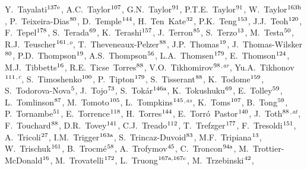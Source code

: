 \begin{flushleft}
Y.~Tayalati$^\textrm{\scriptsize 137e}$,
A.C.~Taylor$^\textrm{\scriptsize 107}$,
G.N.~Taylor$^\textrm{\scriptsize 91}$,
P.T.E.~Taylor$^\textrm{\scriptsize 91}$,
W.~Taylor$^\textrm{\scriptsize 163b}$,
P.~Teixeira-Dias$^\textrm{\scriptsize 80}$,
D.~Temple$^\textrm{\scriptsize 144}$,
H.~Ten~Kate$^\textrm{\scriptsize 32}$,
P.K.~Teng$^\textrm{\scriptsize 153}$,
J.J.~Teoh$^\textrm{\scriptsize 120}$,
F.~Tepel$^\textrm{\scriptsize 178}$,
S.~Terada$^\textrm{\scriptsize 69}$,
K.~Terashi$^\textrm{\scriptsize 157}$,
J.~Terron$^\textrm{\scriptsize 85}$,
S.~Terzo$^\textrm{\scriptsize 13}$,
M.~Testa$^\textrm{\scriptsize 50}$,
R.J.~Teuscher$^\textrm{\scriptsize 161}$$^{,o}$,
T.~Theveneaux-Pelzer$^\textrm{\scriptsize 88}$,
J.P.~Thomas$^\textrm{\scriptsize 19}$,
J.~Thomas-Wilsker$^\textrm{\scriptsize 80}$,
P.D.~Thompson$^\textrm{\scriptsize 19}$,
A.S.~Thompson$^\textrm{\scriptsize 56}$,
L.A.~Thomsen$^\textrm{\scriptsize 179}$,
E.~Thomson$^\textrm{\scriptsize 124}$,
M.J.~Tibbetts$^\textrm{\scriptsize 16}$,
R.E.~Ticse~Torres$^\textrm{\scriptsize 88}$,
V.O.~Tikhomirov$^\textrm{\scriptsize 98}$$^{,ar}$,
Yu.A.~Tikhonov$^\textrm{\scriptsize 111}$$^{,c}$,
S.~Timoshenko$^\textrm{\scriptsize 100}$,
P.~Tipton$^\textrm{\scriptsize 179}$,
S.~Tisserant$^\textrm{\scriptsize 88}$,
K.~Todome$^\textrm{\scriptsize 159}$,
S.~Todorova-Nova$^\textrm{\scriptsize 5}$,
J.~Tojo$^\textrm{\scriptsize 73}$,
S.~Tok\'ar$^\textrm{\scriptsize 146a}$,
K.~Tokushuku$^\textrm{\scriptsize 69}$,
E.~Tolley$^\textrm{\scriptsize 59}$,
L.~Tomlinson$^\textrm{\scriptsize 87}$,
M.~Tomoto$^\textrm{\scriptsize 105}$,
L.~Tompkins$^\textrm{\scriptsize 145}$$^{,as}$,
K.~Toms$^\textrm{\scriptsize 107}$,
B.~Tong$^\textrm{\scriptsize 59}$,
P.~Tornambe$^\textrm{\scriptsize 51}$,
E.~Torrence$^\textrm{\scriptsize 118}$,
H.~Torres$^\textrm{\scriptsize 144}$,
E.~Torr\'o~Pastor$^\textrm{\scriptsize 140}$,
J.~Toth$^\textrm{\scriptsize 88}$$^{,at}$,
F.~Touchard$^\textrm{\scriptsize 88}$,
D.R.~Tovey$^\textrm{\scriptsize 141}$,
C.J.~Treado$^\textrm{\scriptsize 112}$,
T.~Trefzger$^\textrm{\scriptsize 177}$,
F.~Tresoldi$^\textrm{\scriptsize 151}$,
A.~Tricoli$^\textrm{\scriptsize 27}$,
I.M.~Trigger$^\textrm{\scriptsize 163a}$,
S.~Trincaz-Duvoid$^\textrm{\scriptsize 83}$,
M.F.~Tripiana$^\textrm{\scriptsize 13}$,
W.~Trischuk$^\textrm{\scriptsize 161}$,
B.~Trocm\'e$^\textrm{\scriptsize 58}$,
A.~Trofymov$^\textrm{\scriptsize 45}$,
C.~Troncon$^\textrm{\scriptsize 94a}$,
M.~Trottier-McDonald$^\textrm{\scriptsize 16}$,
M.~Trovatelli$^\textrm{\scriptsize 172}$,
L.~Truong$^\textrm{\scriptsize 167a,167c}$,
M.~Trzebinski$^\textrm{\scriptsize 42}$,
$$
\end{flushleft}
